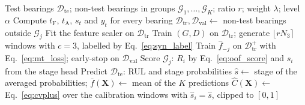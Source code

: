 \begin{algorithm}[!htbp]
\caption{Proposed framework for one set of test bearings.}
\label{alg:framework}
\begin{algorithmic}[1]
\Require Test bearings $\mathcal{D}_{\mathrm{te}}$; non-test bearings
         in groups $\mathcal{G}_1, \dots, \mathcal{G}_K$; ratio $r$;
         weight $\lambda$; level $\alpha$
\State Compute $t_{\mathrm{F}}$, $t_{\mathrm{A}}$, $s_t$ and $y_t$ for
       every bearing 
  \State $\mathcal{D}_{\mathrm{tr}}, \mathcal{D}_{\mathrm{val}} \gets$
         non-test bearings outside $\mathcal{G}_j$
  \State Fit the feature scaler on $\mathcal{D}_{\mathrm{tr}}$
   
    \State Train $(G, D)$ on $\mathcal{D}_{\mathrm{tr}}$; generate
           $\lfloor r N_3 \rceil$ windows with $c=3$, labelled by
           Eq.~\eqref{eq:syn_label}
  \EndIf
  \State Train $\hat{f}_{-j}$ on $\mathcal{D}_{\mathrm{tr}}^{+}$ with
         Eq.~\eqref{eq:mt_loss}; early-stop on $\mathcal{D}_{\mathrm{val}}$
  \State Score $\mathcal{G}_j$: $R_i$ by Eq.~\eqref{eq:oof_score} and
         $\hat{s}_i$ from the stage head
  \State Predict $\mathcal{D}_{\mathrm{te}}$: RUL and stage probabilities
\EndFor
{} 
  \State $\hat{s} \gets$ stage of the averaged probabilities;
         $\bar{f}(\mathbf{X}) \gets$ mean of the $K$ predictions
  \State $\hat{C}(\mathbf{X}) \gets$ Eq.~\eqref{eq:cvplus} over the
         calibration windows with $\hat{s}_i = \hat{s}$, clipped to $[0,1]$
\EndFor
\end{algorithmic}
\end{algorithm}
